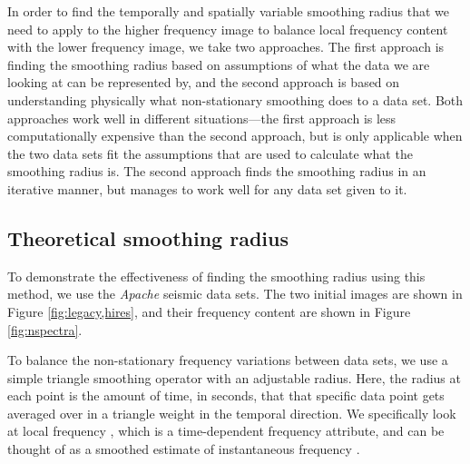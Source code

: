         In order to find the temporally and spatially variable smoothing radius that we need to apply to the higher frequency image to balance local frequency content with the lower frequency image, we take two approaches.
        The first approach is finding the smoothing radius based on assumptions of what the data we are looking at can be represented by, and the second approach is based on understanding physically what non-stationary smoothing does to a data set.
        Both approaches work well in different situations---the first approach is less computationally expensive than the second approach, but is only applicable when the two data sets fit the assumptions that are used to calculate what the smoothing radius is.
        The second approach finds the smoothing radius in an iterative manner, but manages to work well for any data set given to it.


        \subsection{Theoretical smoothing radius}
        To demonstrate the effectiveness of finding the smoothing radius using this method, we use the {\it Apache} seismic data sets.
        The two initial images are shown in Figure \ref{fig:legacy,hires}, and their frequency content are shown in Figure \ref{fig:nspectra}.

        To balance the non-stationary frequency variations between data sets, we use a simple triangle smoothing operator with an adjustable radius. 
        Here, the radius at each point is the amount of time, in seconds, that that specific data point gets averaged over in a triangle weight in the temporal direction.
        We specifically look at local frequency \cite[]{attr}, which is a time-dependent frequency attribute, and can be thought of as a smoothed estimate of instantaneous frequency \cite[]{white}. 

